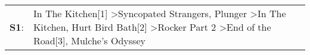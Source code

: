 \begin{supertabular}{p{0.03\textwidth}p{0.92\textwidth}}
 \textbf{S1}:  &  In The Kitchen[1]\textsuperscript{} \textgreater \enspace Syncopated Strangers\textsuperscript{}, \enspace Plunger\textsuperscript{} \textgreater \enspace In The Kitchen\textsuperscript{}, \enspace Hurt Bird Bath[2]\textsuperscript{} \textgreater \enspace Rocker Part 2\textsuperscript{} \textgreater \enspace End of the Road[3]\textsuperscript{}, \enspace Mulche's Odyssey\textsuperscript{}  \enspace  \\
\end{supertabular}
